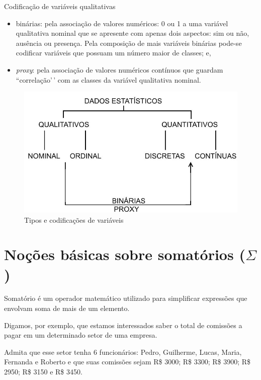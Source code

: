 \documentclass[
]{book}
\providecommand{\tightlist}{%
  \setlength{\itemsep}{0pt}\setlength{\parskip}{0pt}}
\begin{document}
Codificação de variáveis qualitativas

\begin{itemize}
\tightlist
\item
  binárias: pela associação de valores numéricos: 0 ou 1 a uma variável qualitativa nominal que se apresente com apenas dois aspectos: sim ou não, ausência ou presença. Pela composição de mais variáveis binárias pode-se codificar variáveis que possuam um número maior de classes; e,
\item
  \emph{proxy}: pela associação de valores numéricos contínuos que guardam ``correlação'\,' com as classes da variável qualitativa nominal.
\end{itemize}

\begin{figure}

{\centering \includegraphics[width=0.75\linewidth]{images2/tipos_variaveis} 

}

\caption{Tipos e codificações de variáveis }\label{fig:unnamed-chunk-25}
\end{figure}

\hypertarget{nouxe7uxf5es-buxe1sicas-sobre-somatuxf3rios-sigma}{%
\section{\texorpdfstring{Noções básicas sobre somatórios (\(\Sigma\))}{Noções básicas sobre somatórios (\textbackslash Sigma)}}\label{nouxe7uxf5es-buxe1sicas-sobre-somatuxf3rios-sigma}}

Somatório é um operador matemático utilizado para simplificar expressões que envolvam soma de mais de um elemento.

Digamos, por exemplo, que estamos interessados saber o total de comissões a pagar em um determinado setor de uma empresa.

Admita que esse setor tenha 6 funcionários: Pedro, Guilherme, Lucas, Maria, Fernanda e Roberto e que suas comissões sejam R\$ 3000; R\$ 3300; R\$ 3900; R\$ 2950; R\$ 3150 e R\$ 3450.
\end{document}
